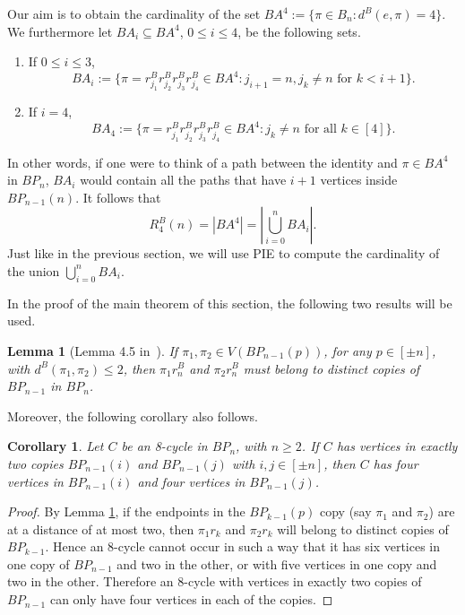 \documentclass[final]{dmtcs-episciences}
\numberwithin{equation}{section}
\newtheorem{lem}[thm]{Lemma}
\newtheorem{cor}[thm]{Corollary}
\begin{document}
Our aim is to obtain the cardinality of the set $BA^4:=\{\pi\in B_n: d^B(e,\pi)=4\}$. We furthermore let $BA_i\subseteq BA^4$, $0\leq i\leq 4$, be the following sets.

\begin{enumerate}
    \item If $0\leq i\leq 3$,  \begin{displaymath}BA_i := \{\pi=r^B_{j_1}r^B_{j_2}r^B_{j_3}r^B_{j_4} \in BA^4: j_{i+1}=n,j_k\neq n\text{ for }k<i+1\}.\end{displaymath}
    \item If $i=4$, \begin{displaymath}BA_4 := \{\pi=r^B_{j_1}r^B_{j_2}r^B_{j_3}r^B_{j_4} \in BA^4:  j_k\neq n \text{ for all }k\in[4]\}.\end{displaymath}
\end{enumerate}

In other words, if one were to think of a path between the identity and $\pi\in BA^4$ in $BP_n$, $BA_i$ would contain all the paths that have $i+1$ vertices inside $BP_{n-1}(n)$. It follows that 
\begin{equation}\label{eq:bPIE}
R^B_4(n)=|BA^4|=\left|\bigcup_{i=0}^n BA_i\right|.
\end{equation}
Just like in the previous section, we will use PIE to compute the cardinality of the union $\bigcup_{i=0}^n BA_i$. 

In the proof of the main theorem of this section, the following two results will be used.

\begin{lem}[Lemma 4.5 in~\cite{BBP2018}]\label{l:4.5}
If $\pi_1, \pi_2 \in V (BP_{n-1}(p))$, for any $p \in [\pm n]$, with $d^B(\pi_1, \pi_2) \leq 2$, then $\pi_1r^B_n$ and $\pi_2r^B_n$ must belong to distinct copies of $BP_{n-1}$ in $BP_n$.
\end{lem} Moreover, the following corollary also follows. 

\begin{cor}\label{c:4vertices}
Let $C$ be an 8-cycle in $BP_n$, with $n\geq2$. If $C$ has vertices in exactly two copies $BP_{n-1}(i)$ and $BP_{n-1}(j)$ with $i,j\in[\pm n]$, then $C$ has four vertices in $BP_{n-1}(i)$ and four vertices in $BP_{n-1}(j)$.
\end{cor}
\begin{proof}
By Lemma \ref{l:4.5}, if the endpoints in the $BP_{k-1}(p)$ copy (say $\pi_1$ and $\pi_2$) are at a distance of at most two, then $\pi_1r_k$ and $\pi_2r_k$ will belong to distinct copies of $BP_{k-1}$. Hence an 8-cycle cannot occur in such a way that it has six vertices in one copy of $BP_{n-1}$ and two in the other, or with five vertices in one copy and two in the other. Therefore an 8-cycle with vertices in exactly two copies of $BP_{n-1}$ can only have four vertices in each of the copies.
\end{proof}
\end{document}
